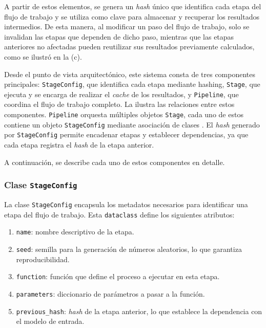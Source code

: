 A partir de estos elementos, se genera un \textit{hash} único \cite{gauravaram2010cryptographic} que identifica cada etapa del flujo de trabajo y se utiliza como clave para almacenar y recuperar los resultados intermedios. De esta manera, al modificar un paso del flujo de trabajo, solo se invalidan las etapas que dependen de dicho paso, mientras que las etapas anteriores no afectadas pueden reutilizar sus resultados previamente calculados, como se ilustró en la (c).

Desde el punto de vista arquitectónico, este sistema consta de tres componentes principales: \texttt{StageConfig}, que identifica cada etapa mediante hashing, \texttt{Stage}, que ejecuta y se encarga de realizar el \textit{cache} de los resultados, y \texttt{Pipeline}, que coordina el flujo de trabajo completo. La  ilustra las relaciones entre estos componentes. \texttt{Pipeline} orquesta múltiples objetos \texttt{Stage}, cada uno de estos contiene un objeto \texttt{StageConfig} mediante asociaci\'on de clases \cite{rumbaugh1991object}. El \textit{hash} generado por \texttt{StageConfig} permite encadenar etapas y establecer dependencias, ya que cada etapa registra el \textit{hash} de la etapa anterior.


A continuación, se describe cada uno de estos componentes en detalle.

\subsubsection{Clase \texttt{StageConfig}}

La clase \texttt{StageConfig} \cite{qtensor_stage} encapsula los metadatos necesarios para identificar una etapa del flujo de trabajo. Esta \texttt{dataclass} \cite{python_dataclasses} define los siguientes atributos:

\begin{enumerate}
    \item \texttt{name}: nombre descriptivo de la etapa.
    \item \texttt{seed}: semilla para la generación de números aleatorios, lo que garantiza reproducibilidad.
    \item \texttt{function}: función que define el proceso a ejecutar en esta etapa.
    \item \texttt{parameters}: diccionario de parámetros a pasar a la función.
    \item \texttt{previous\_hash}: \textit{hash} de la etapa anterior, lo que establece la dependencia con el modelo de entrada.
\end{enumerate}

